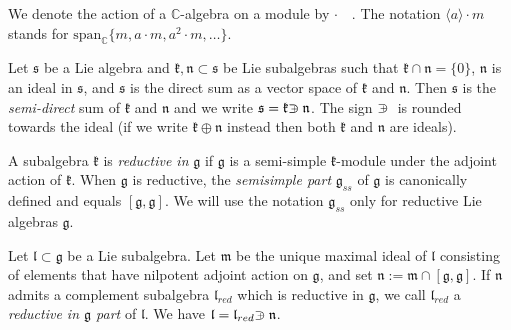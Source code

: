 \documentclass[12pt]{report}
\newcommand {\CC} {\mathbb {C}}
\newcommand{\sS}{\mathfrak{s}}
\newcommand{\kk}{\mathfrak{k}}
\newcommand{\nn}{\mathfrak{n}}
\newcommand{\mm}{\mathfrak{m}}
\newcommand{\gG}{\mathfrak{g}}
\newcommand{\lL}{\mathfrak{l}}
\newcommand{\linspan}{\mathrm{span}}
\def\crplus{\hbox{$\supset${\raise1.05pt\hbox{\kern -0.60em ${\scriptscriptstyle +}$}}\ }}
\begin{document}
We denote the action of a $\CC$-algebra on a module by $\cdot$~~. The notation $\langle a\rangle\cdot m$ stands for $\linspan_\CC\{m,a\cdot m, a^2\cdot m,\dots\}$.

Let $\sS$ be a Lie algebra and $\kk,\nn\subset\sS$ be Lie subalgebras such that $\kk\cap\nn=\{0\}$, $\nn$ is an ideal in $\sS$, and $\sS$ is the direct sum as a vector space of $\kk$ and $\nn$. Then $\sS$ is the \emph{semi-direct} sum of $\kk$ and $\nn$ and we write $\sS=\kk\crplus\nn$. The sign $\crplus$ is rounded towards the ideal (if we write $\kk\oplus\nn$ instead then both $\kk$ and $\nn$ are ideals).

A subalgebra $\kk$ is \textit{reductive in} $\gG$ if $\gG$ is a semi-simple $\kk$-module under the adjoint action of $\kk$. When $\gG$ is reductive, the \textit{semisimple part} $\gG_{ss}$ of $\gG$ is canonically defined and equals $[\gG,\gG]$. We will use the notation $\gG_{ss}$ only for reductive Lie algebras $\gG$.



Let $\lL\subset\gG$ be a Lie subalgebra.  Let $\mm$ be the unique maximal ideal of $\lL$ consisting of elements that have nilpotent adjoint action on $\gG$, and set $\nn:=\mm\cap[\gG,\gG]$. If $\nn$ admits a complement subalgebra $\lL_{red}$ which is reductive in $\gG$, we call $\lL_{red}$ a \textit{reductive in $\gG$ part} of $\lL$. We have $\lL=\lL_{red}\crplus\nn$.
\end{document}
